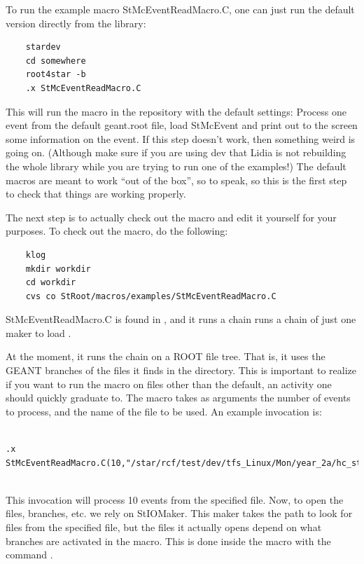 To run the example macro StMcEventReadMacro.C, one can just
run the default version directly from the library:
\begin{verbatim}
    stardev
    cd somewhere
    root4star -b
    .x StMcEventReadMacro.C
\end{verbatim}
This will run the macro in the repository with the default settings:
Process one event from the default geant.root file, load StMcEvent
and print out to the screen some information on the event.
If this step doesn't work, then something weird is going on.  (Although
make sure if you are using dev that Lidia is not rebuilding the whole
library while you are trying to run one of the examples!)  The
default macros are meant to work ``out of the box'', so to speak,
so this is the first step to check that things are working
properly.

The next step is to actually check out the macro and edit it yourself for
your purposes.  To check out the macro, do the following:
\begin{verbatim}
    klog
    mkdir workdir
    cd workdir
    cvs co StRoot/macros/examples/StMcEventReadMacro.C
\end{verbatim}

StMcEventReadMacro.C is found in
,  %
and it runs a chain runs a chain of just one maker to load \StMcEvent .



At the moment, it runs the chain on a ROOT file tree.  That is, it uses
the GEANT branches of the files it finds in the directory.  This is important to
realize if you want to run the macro on files other than the default, an
activity one should quickly graduate to.  The macro takes as arguments the
number of events to process, and the name of the file to be used.  An example invocation
is:

{\footnotesize

\begin{verbatim}

.x StMcEventReadMacro.C(10,"/star/rcf/test/dev/tfs_Linux/Mon/year_2a/hc_standard/*.geant.root")
     

\end{verbatim}
}
This invocation will process 10 events from the specified file.
Now, to open the files, branches, etc. we rely on StIOMaker.  This maker
takes the path to look for files from the specified file, but the files
it actually
opens depend on
what branches are activated in the macro.
This is done inside the macro with the command .

